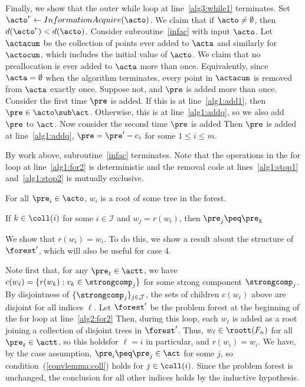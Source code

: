 Finally, we show that the outer while loop at line~\ref{alg3:while1} terminates.
Set $\acto^r \leftarrow InformationAcquire(\acto)$. 
We claim that if $\acto \not = \emptyset$, then $d(\acto^r) < d(\acto)$. 
Consider subroutine~\ref{infac} with input $\acto$. 
Let $\actacum$ be the collection of points ever added to $\acta$ and similarly for $\actocum$, which includes the initial value of $\acto$. 
We claim that no preallocation is ever added to $\acta$ more than once. 
Equivalently, since $\acta = \emptyset$ when the algorithm terminates, every point in $\actacum$ is removed from $\acta$ exactly once. 
Suppose not, and $\pre$ is added more than once. 
Consider the first time $\pre$ is added. 
If this is at line~\ref{alg1:add1}, then $\pre \in \acto \sub \act$.
Otherwise, this is at line~\ref{alg1:addq}, so we also add $\pre$ to $\act$.
Now consider the second time $\pre$ is added 
Then $\pre$ is added at line~\ref{alg1:addq}, $\pre = \pre' - e_i$ for some $1 \leq i \leq m$.


By work above, subroutine~\ref{infac} terminates.
Note that the operations in the for loop at line~\ref{alg1:for2} is deterministic and the removal code at lines~\ref{alg1:stop1} and~\ref{alg1:stop2} is mutually exclusive. 

\item For all $\pre_i \in \acto$, $w_i$ is a root of some tree in the forest.

\item If $k \in \coll(i)$ for some $i \in \mathcal{I}$ and $w_j = r(w_i)$, then $\pre_j \peq \pre_k$ \label{lemma:coll}

We show that $r(w_i) = w_i$. 
To do this, we show a result about the structure of $\forest'$, which will also be useful for case 4. 

Note first that, for any $\pre_{\ell} \in \actt$, we have $c(w_{\ell}) = \{r(w_k): v_k \in \strongcomp_j\}$ for some strong component $\strongcomp_j$. 
By disjointness of $\{\strongcomp_j\}_{j \in \mathcal{J}}$, the sets of children $c(w_{\ell})$ above are disjoint for all indices $\ell$. %
Let $\forest'$ be the problem forest at the beginning of the for loop at line~\ref{alg2:for2}
Then, during this loop, each $w_{\ell}$ is added as a root joining a collection of disjoint trees in $\forest'$. 
Thus, $w_{\ell} \in \roott(F_n)$ for all $\pre_{\ell} \in \actt$, so this holdsfor $\ell = i$ in particular, and $r(w_i) = w_i$. 
We have, by the case assumption, $\pre_i \peq \pre_j \in \act$ for some $j$, so  condition~(\ref{convlemma:coll}) holds for $j \in \coll(i)$. 
Since the problem forest is unchanged, the conclusion for all other indices holds by the inductive hypothesis. 

